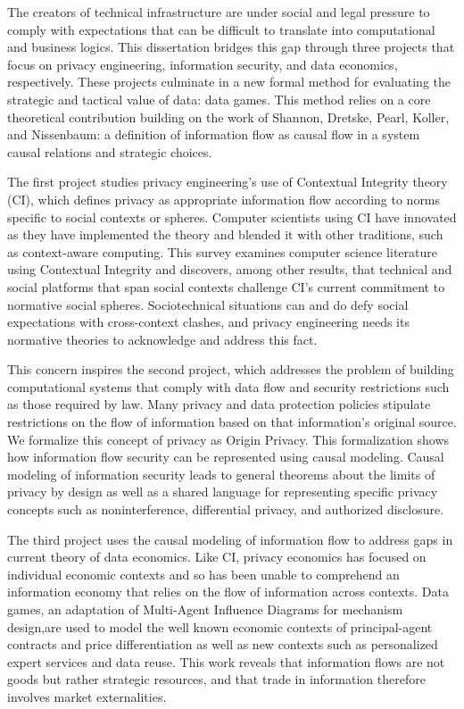 \documentclass[../thesis.tex]{subfiles}
\begin{document}
 The creators of technical infrastructure are under social and
 legal pressure to comply with expectations that can be difficult
 to translate into computational and business logics.
 This dissertation bridges this gap through three projects that focus on
 privacy engineering, information security, and data economics, respectively.
 These projects culminate in a new formal method for evaluating the strategic
 and tactical value of data: data games.
 This method relies on a core theoretical contribution building on the work of
 Shannon, Dretske, Pearl, Koller, and Nissenbaum: a definition of information
 flow as causal flow in a system
 causal relations and strategic choices.

 The first project studies privacy engineering's use of
 Contextual Integrity theory (CI), which defines
 privacy as appropriate information flow according to norms
 specific to social contexts or spheres.
 Computer scientists using CI
 have innovated as they have implemented the theory and
 blended it with other traditions, such as context-aware
 computing. This survey examines
 computer science literature using Contextual Integrity and
 discovers, among other results, that technical and social platforms
 that span social contexts challenge CI's current commitment
 to normative social spheres.
 Sociotechnical situations can and do defy social expectations
 with cross-context clashes, and privacy engineering
 needs its normative theories to acknowledge and address this
 fact.
 
 This concern inspires the second project, which addresses the
 problem of building computational systems that comply with data
 flow and security restrictions such as those required by law.
 Many privacy and data protection policies stipulate
 restrictions on the flow of information based on that
 information's original source.
 We formalize this concept of privacy as Origin Privacy.
 This formalization shows how information flow security
 can be represented using causal modeling.
 Causal modeling of information security leads to
 general theorems about the limits of privacy by design
 as well as a shared language for representing specific
 privacy concepts such as noninterference, differential
 privacy, and authorized disclosure.

 The third project uses the causal modeling of information
 flow to address gaps in current theory of data economics.
 Like CI, privacy economics has focused on individual
 economic contexts and so has been unable to comprehend
 an information economy that relies on the flow of
 information across contexts.
 Data games, an adaptation of Multi-Agent Influence Diagrams
 for mechanism design,are used to model the well known
 economic contexts of principal-agent contracts and
 price differentiation as well as new contexts
 such as personalized expert services and data reuse.
 This work reveals that information flows are not
 goods but rather strategic resources, and that
 trade in information therefore involves
 market externalities.
 
 
\end{document}
